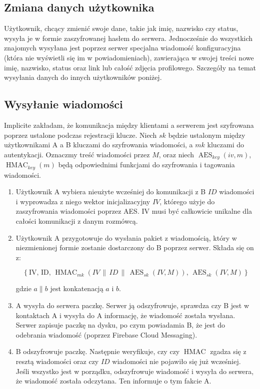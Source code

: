 \documentclass{article}
\DeclareMathOperator{\AES}{AES}
\DeclareMathOperator{\HMAC}{HMAC}
\begin{document}
\subsection{Zmiana danych użytkownika}

Użytkownik, chcący zmienić swoje dane, takie jak imię, nazwisko czy status, wysyła je w formie zaszyfrowanej hasłem do serwera.
Jednocześnie do wszystkich znajomych wysyłana jest poprzez serwer specjalna wiadomość konfiguracyjna (która nie wyświetli
się im w powiadomieniach), zawierająca w swojej treści nowe imię, nazwisko, status oraz link lub całość zdjęcia profilowego. Szczegóły
na temat wysyłania danych do innych użytkowników poniżej.

\subsection{Wysyłanie wiadomości}

Implicite zakładam, że komunikacja między klientami a serwerem jest szyfrowana poprzez ustalone podczas rejestracji klucze. Niech
$sk$ będzie ustalonym między użytkownikami A a B kluczami do szyfrowania wiadomości, a $mk$ kluczami do autentykacji.
Oznaczmy treść wiadomości przez $M$, oraz niech $\AES_{key}(iv, m)$, $\HMAC_{key}(m)$ będą odpowiednimi funkcjami do szyfrowania i 
tagowania wiadomości.

\begin{enumerate}
\item Użytkownik A wybiera nieużyte wcześniej do komunikacji z B $ID$ wiadomości i wyprowadza z niego wektor inicjalizacyjny $IV$,
którego użyje do zaszyfrowania wiadomości poprzez AES. IV musi być całkowicie unikalne dla całości komunikacji z danym rozmówcą.

\item Użytkownik A przygotowuje do wysłania pakiet z wiadomością, który w niezmienionej formie zostanie dostarczony do B
poprzez serwer. Składa się on z:

$$\left\{\textrm{IV},\, \textrm{ID}, \,\HMAC_{mk}(IV\,\parallel\,ID\,\parallel\,\AES_{sk}(IV, M)), \,\AES_{sk}(IV, M)\right\}$$

gdzie $a \parallel b$ jest konkatenacją $a$ i $b$.

\item A wysyła do serwera paczkę. Serwer ją odszyfrowuje, sprawdza czy B jest w kontaktach A i wysyła do A informację, że wiadomość
została wysłana. Serwer zapisuje paczkę na dysku, po czym powiadamia B, że jest do odebrania wiadomość (poprzez Firebase Cloud Messaging).

\item B odszyfrowuje paczkę. Następnie weryfikuje, czy czy $\HMAC$ zgadza się z resztą wiadomości oraz 
czy $ID$ wiadomości nie pojawiło się już wcześniej. Jeśli wszystko jest w porządku, odszyfrowuje wiadomość i wysyła do serwera, że wiadomość
została odczytana. Ten informuje o tym fakcie A.
\end{enumerate} 
\end{document}
